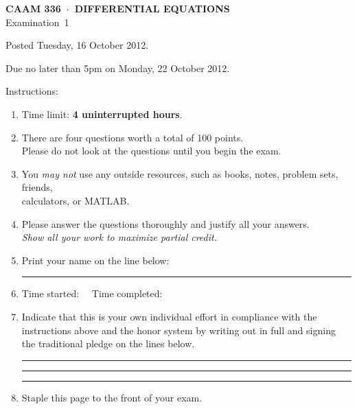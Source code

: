 \documentclass[11pt]{article}
\begin{document}
\thispagestyle{empty}
\vspace*{0em}
   \begin{center}
      \textsf{\textbf{CAAM 336\ $\cdot$\ DIFFERENTIAL EQUATIONS}}\\[0.5em]
       \textsf{Examination~1}
   \end{center}

\vspace*{3em}

   Posted Tuesday, 16 October 2012. 

   Due no later than 5pm on Monday, 22 October 2012.

\vspace*{3em}
Instructions:
\begin{enumerate}
\item Time limit: \textbf{4 uninterrupted hours}.
\item There are four questions worth a total of 100 points.\\
      Please do not look at the questions until you begin the exam.
\item You \emph{may not} use any outside resources,
      such as books, notes, problem sets, friends,\\
      calculators, or MATLAB. 
\item Please answer the questions thoroughly and justify all your answers.\\
      \emph{Show all your work to maximize partial credit.}

\item Print your name on the line below:

\vspace*{1em}\rule{6in}{0.5pt}

\item Time started: \hrulefill\ \ Time completed: \hrulefill

\item Indicate that this is your own individual effort in compliance with 
      the instructions above and the honor system by writing out in full 
      and signing the traditional pledge on the lines below.

\vspace*{1em}\rule{6in}{0.5pt}

\vspace*{1em}\rule{6in}{0.5pt}

\vspace*{1em}\rule{6in}{0.5pt}

\item Staple this page to the front of your exam.

\end{enumerate}
\end{document}
